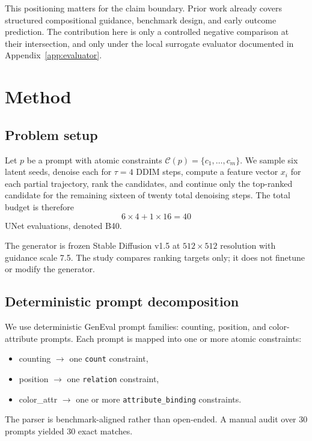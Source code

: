 \documentclass{article}
\newcommand{\budget}{B40}
\newcommand{\tauprefix}{\tau}
\begin{document}
This positioning matters for the claim boundary. Prior work already covers structured compositional guidance, benchmark design, and early outcome prediction. The contribution here is only a controlled negative comparison at their intersection, and only under the local surrogate evaluator documented in Appendix~\ref{app:evaluator}.

\section{Method}
\label{sec:method}
\subsection{Problem setup}
Let $p$ be a prompt with atomic constraints $\mathcal{C}(p)=\{c_1,\dots,c_m\}$. We sample six latent seeds, denoise each for $\tauprefix=4$ DDIM steps, compute a feature vector $x_i$ for each partial trajectory, rank the candidates, and continue only the top-ranked candidate for the remaining sixteen of twenty total denoising steps. The total budget is therefore
\[
6 \times 4 + 1 \times 16 = 40
\]
UNet evaluations, denoted \budget{}.

The generator is frozen Stable Diffusion v1.5 \citep{rombach2022highresolutionimagesynthesislatent} at $512 \times 512$ resolution with guidance scale 7.5. The study compares ranking targets only; it does not finetune or modify the generator.

\subsection{Deterministic prompt decomposition}
We use deterministic GenEval prompt families: counting, position, and color-attribute prompts. Each prompt is mapped into one or more atomic constraints:
\begin{itemize}
  \item counting $\rightarrow$ one \texttt{count} constraint,
  \item position $\rightarrow$ one \texttt{relation} constraint,
  \item color\_attr $\rightarrow$ one or more \texttt{attribute\_binding} constraints.
\end{itemize}
The parser is benchmark-aligned rather than open-ended. A manual audit over 30 prompts yielded 30 exact matches.
\end{document}
